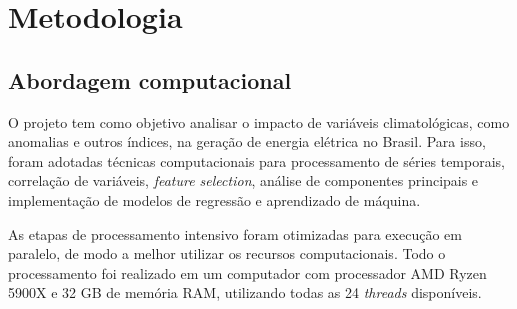 \chapter{Metodologia}
\section{Abordagem computacional}

O projeto tem como objetivo analisar o impacto de variáveis climatológicas, como anomalias e outros índices, na geração
de energia elétrica no Brasil. Para isso, foram adotadas técnicas computacionais para processamento de séries temporais,
correlação de variáveis, \textit{feature selection}, análise de componentes principais e implementação de modelos de 
regressão e aprendizado de máquina. 

As etapas de processamento intensivo foram otimizadas para execução em paralelo,
de modo a melhor utilizar os recursos computacionais. Todo o processamento foi realizado em um computador com 
processador AMD Ryzen 5900X e 32 GB de memória RAM, utilizando todas as 24 \textit{threads} disponíveis.

\begin{table}[htb]
  \centering
\end{table}

